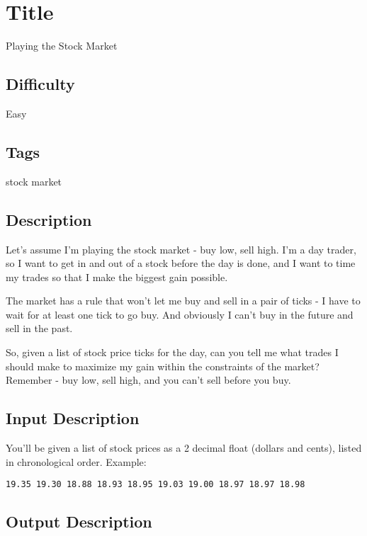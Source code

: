 \section{Title}\label{title-9}

Playing the Stock Market

\subsection{Difficulty}\label{difficulty-9}

Easy

\subsection{Tags}\label{tags-9}

stock market

\subsection{Description}\label{description-9}

Let's assume I'm playing the stock market - buy low, sell high. I'm a
day trader, so I want to get in and out of a stock before the day is
done, and I want to time my trades so that I make the biggest gain
possible.

The market has a rule that won't let me buy and sell in a pair of ticks
- I have to wait for at least one tick to go buy. And obviously I can't
buy in the future and sell in the past.

So, given a list of stock price ticks for the day, can you tell me what
trades I should make to maximize my gain within the constraints of the
market? Remember - buy low, sell high, and you can't sell before you
buy.

\subsection{Input Description}\label{input-description-8}

You'll be given a list of stock prices as a 2 decimal float (dollars and
cents), listed in chronological order. Example:

\begin{verbatim}
19.35 19.30 18.88 18.93 18.95 19.03 19.00 18.97 18.97 18.98
\end{verbatim}

\subsection{Output Description}\label{output-description-8}

